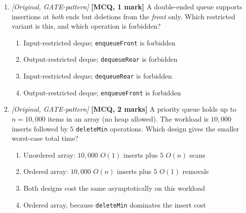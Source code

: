 \documentclass[11pt]{article}
\begin{document}
\begin{enumerate}
\item[\textbf{Q7}] \textit{[Original, GATE-pattern]} \textbf{[MCQ, 1 mark]} A double-ended queue supports insertions at \emph{both} ends but deletions from the \emph{front} only. Which restricted variant is this, and which operation is forbidden?
\begin{enumerate}
  \item[(A)] Input-restricted deque; \texttt{enqueueFront} is forbidden
  \item[(B)] Output-restricted deque; \texttt{dequeueRear} is forbidden
  \item[(C)] Input-restricted deque; \texttt{dequeueRear} is forbidden
  \item[(D)] Output-restricted deque; \texttt{enqueueFront} is forbidden
\end{enumerate}

\item[\textbf{Q8}] \textit{[Original, GATE-pattern]} \textbf{[MCQ, 2 marks]} A priority queue holds up to $n = 10{,}000$ items in an array (no heap allowed). The workload is $10{,}000$ inserts followed by $5$ \texttt{deleteMin} operations. Which design gives the smaller worst-case total time?
\begin{enumerate}
  \item[(A)] Unordered array: $10{,}000$ $O(1)$ inserts plus $5$ $O(n)$ scans
  \item[(B)] Ordered array: $10{,}000$ $O(n)$ inserts plus $5$ $O(1)$ removals
  \item[(C)] Both designs cost the same asymptotically on this workload
  \item[(D)] Ordered array, because \texttt{deleteMin} dominates the insert cost
\end{enumerate}

\end{enumerate}
\end{document}
